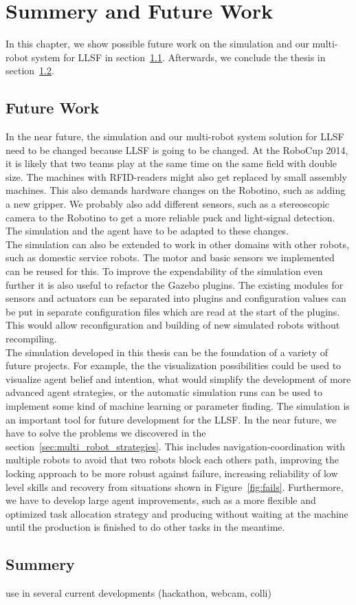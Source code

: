 \chapter{Summery and Future Work}
\label{cha:summery_and_future_work}
In this chapter, we show possible future work on the simulation and our multi-robot system for LLSF in section~\ref{sec:future_work}. Afterwards, we conclude the thesis in section~\ref{sec:summery}.

\section{Future Work}
\label{sec:future_work}
In the near future, the simulation and our multi-robot system solution for LLSF need to be changed because LLSF is going to be changed. At the RoboCup 2014, it is likely that two teams play at the same time on the same field with double size. The machines with RFID-readers might also get replaced by small assembly machines. This also demands hardware changes on the Robotino, such as adding a new gripper. We probably also add different sensors, such as a stereoscopic camera to the Robotino to get a more reliable puck and light-signal detection. The simulation and the agent have to be adapted to these changes.\\
The simulation can also be extended to work in other domains with other robots, such as domestic service robots. The motor and basic sensors we implemented can be reused for this. To improve the expendability of the simulation even further it is also useful to refactor the Gazebo plugins. The existing modules for sensors and actuators can be separated into plugins and configuration values can be put in separate configuration files which are read at the start of the plugins. This would allow reconfiguration and building of new simulated robots without recompiling.\\
The simulation developed in this thesis can be the foundation of a variety of future projects. For example, the the visualization possibilities could be used to visualize agent belief and intention, what would simplify the development of more advanced agent strategies, or the automatic simulation runs can be used to implement some kind of machine learning or parameter finding. The simulation is an important tool for future development for the LLSF. In the near future, we have to solve the problems we discovered in the section~\ref{sec:multi_robot_strategies}. This includes navigation-coordination with multiple robots to avoid that two robots block each others path, improving the locking approach to be more robust against failure, increasing reliability of low level skills and recovery from situations shown in Figure~\ref{fig:fails}. Furthermore, we have to develop large agent improvements, such as a more flexible and optimized task allocation strategy and producing without waiting at the machine until the production is finished to do other tasks in the meantime.

\section{Summery}
\label{sec:summery}

use in several current developments (hackathon, webcam, colli)
